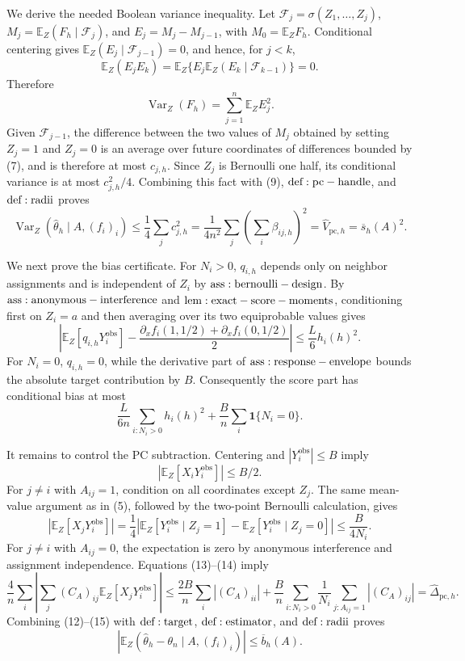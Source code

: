 We derive the needed Boolean variance inequality.  Let \(\mathcal F_j=\sigma(Z_1,\ldots,Z_j)\), \(M_j=\mathbb E_Z(F_h\mid\mathcal F_j)\), and \(E_j=M_j-M_{j-1}\), with \(M_0=\mathbb E_ZF_h\).  Conditional centering gives \(\mathbb E_Z(E_j\mid\mathcal F_{j-1})=0\), and hence, for \(j<k\),
\[
 \mathbb E_Z(E_jE_k)
 =\mathbb E_Z\{E_j\mathbb E_Z(E_k\mid\mathcal F_{k-1})\}=0.
\tag{8}
\]
Therefore
\[
 \operatorname{Var}_Z(F_h)=\sum_{j=1}^n\mathbb E_ZE_j^2.
\tag{9}
\]
Given \(\mathcal F_{j-1}\), the difference between the two values of \(M_j\) obtained by setting \(Z_j=1\) and \(Z_j=0\) is an average over future coordinates of differences bounded by (7), and is therefore at most \(c_{j,h}\).  Since \(Z_j\) is Bernoulli one half, its conditional variance is at most \(c_{j,h}^2/4\).  Combining this fact with (9), \({\rm def:pc-handle}\), and \({\rm def:radii}\) proves
\[
 \operatorname{Var}_Z(\widehat\theta_h\mid A,(f_i)_i)
 \le\frac14\sum_jc_{j,h}^2
 =\frac1{4n^2}\sum_j\left(\sum_i\beta_{ij,h}\right)^2
 =\widehat V_{\mathrm{pc},h}
 =\overline s_h(A)^2.
\tag{10}
\]

We next prove the bias certificate.  For \(N_i>0\), \(q_{i,h}\) depends only on neighbor assignments and is independent of \(Z_i\) by \({\rm ass:bernoulli-design}\).  By \({\rm ass:anonymous-interference}\) and \({\rm lem:exact-score-moments}\), conditioning first on \(Z_i=a\) and then averaging over its two equiprobable values gives
\[
 \left|\mathbb E_Z[q_{i,h}Y_i^{\mathrm{obs}}]
 -\frac{\partial_xf_i(1,1/2)+\partial_xf_i(0,1/2)}2\right|
 \le\frac L6h_i(h)^2.
\tag{11}
\]
For \(N_i=0\), \(q_{i,h}=0\), while the derivative part of \({\rm ass:response-envelope}\) bounds the absolute target contribution by \(B\).  Consequently the score part has conditional bias at most
\[
 \frac{L}{6n}\sum_{i:N_i>0}h_i(h)^2
 +\frac Bn\sum_i\mathbf1\{N_i=0\}.
\tag{12}
\]

It remains to control the PC subtraction.  Centering and \(|Y_i^{\mathrm{obs}}|\le B\) imply
\[
 |\mathbb E_Z[X_iY_i^{\mathrm{obs}}]|\le B/2.
\tag{13}
\]
For \(j\ne i\) with \(A_{ij}=1\), condition on all coordinates except \(Z_j\).  The same mean-value argument as in (5), followed by the two-point Bernoulli calculation, gives
\[
 |\mathbb E_Z[X_jY_i^{\mathrm{obs}}]|
 =\frac14\left|\mathbb E_Z[Y_i^{\mathrm{obs}}\mid Z_j=1]
 -\mathbb E_Z[Y_i^{\mathrm{obs}}\mid Z_j=0]\right|
 \le\frac B{4N_i}.
\tag{14}
\]
For \(j\ne i\) with \(A_{ij}=0\), the expectation is zero by anonymous interference and assignment independence.  Equations (13)--(14) imply
\[
 \frac4n\sum_i\left|\sum_j(C_A)_{ij}\mathbb E_Z[X_jY_i^{\mathrm{obs}}]\right|
 \le\frac{2B}{n}\sum_i|(C_A)_{ii}|
 +\frac Bn\sum_{i:N_i>0}\frac1{N_i}\sum_{j:A_{ij}=1}|(C_A)_{ij}|
 =\widehat\Delta_{\mathrm{pc},h}.
\tag{15}
\]
Combining (12)--(15) with \({\rm def:target}\), \({\rm def:estimator}\), and \({\rm def:radii}\) proves
\[
 \left|\mathbb E_Z(\widehat\theta_h-\theta_n\mid A,(f_i)_i)\right|
 \le\overline b_h(A).
\tag{16}
\]

